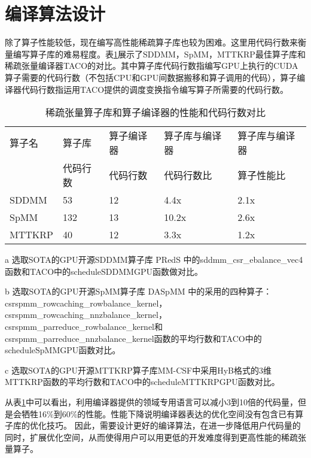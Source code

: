 \section{编译算法设计}
除了算子性能较低，现在编写高性能稀疏算子库也较为困难。这里用代码行数来衡量编写算子库的难易程度。表\ref{tab:motivation-2}展示了SDDMM，SpMM，MTTKRP最佳算子库和稀疏张量编译器TACO的对比。其中算子库代码行数指编写GPU上执行的CUDA算子需要的代码行数（不包括CPU和GPU间数据搬移和算子调用的代码），算子编译器代码行数指运用TACO提供的调度变换指令编写算子所需要的代码行数。
\begin{table}
  \centering
  \begin{threeparttable}[c]
  \caption{稀疏张量算子库和算子编译器的性能和代码行数对比}
  \label{tab:motivation-2}
  \begin{tabular}{lllll}
    \toprule
    算子名  & 算子库 & 算子编译器 & 算子库与编译器 & 算子库与编译器   \\
           & 代码行数 & 代码行数 & 代码行数比    & 算子性能比       \\
    \midrule
    SDDMM\tnote{a}  & 53 & 12 & 4.4x & 2.1x \\
    SpMM\tnote{b}   & 132 & 13 & 10.2x & 2.6x \\
    MTTKRP\tnote{c} & 40 & 12 & 3.3x & 1.2x \\
    \bottomrule
  \end{tabular}
  \begin{tablenotes}
    \item [a] 选取SOTA的GPU开源SDDMM算子库 PRedS \cite{yu2021exploiting}中的sddmm\_csr\_ebalance\_vec4函数和TACO中的scheduleSDDMMGPU函数做对比。
    \item [b] 选取SOTA的GPU开源SpMM算子库 DASpMM \cite{dai2022heuristic}中的采用的四种算子：csrspmm\_rowcaching\_rowbalance\_kernel，
      csrspmm\_rowcaching\_nnzbalance\_kernel，csrspmm\_parreduce\_rowbalance\_kernel和csrspmm\_parreduce\_nnzbalance\_kernel函数的平均行数和TACO中的scheduleSpMMGPU函数对比。
    \item [c] 选取SOTA的GPU开源MTTKRP算子库MM-CSF\cite{nisa2019mttkrp}中采用HyB格式的3维MTTKRP函数的平均行数和TACO中的scheduleMTTKRPGPU函数对比。
  \end{tablenotes}
  \end{threeparttable}
\end{table}
从表\ref{tab:motivation-2}中可以看出，利用编译器提供的领域专用语言可以减小3到10倍的代码量，但是会牺牲16\%到60\%的性能。性能下降说明编译器表达的优化空间没有包含已有算子库的优化技巧。
因此，需要设计更好的编译算法，在进一步降低用户代码量的同时，扩展优化空间，从而使得用户可以用更低的开发难度得到更高性能的稀疏张量算子。
